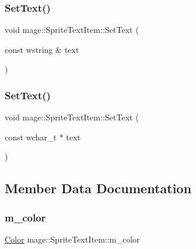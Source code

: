 \hypertarget{structmage_1_1_sprite_text_item_a76da120ec8798b22299d7050e8f05afb}{}\label{structmage_1_1_sprite_text_item_a76da120ec8798b22299d7050e8f05afb} 
\subsubsection{\texorpdfstring{Set\+Text()}{SetText()}\hspace{0.1cm}{\footnotesize\ttfamily [1/2]}}
{\footnotesize\ttfamily void mage\+::\+Sprite\+Text\+Item\+::\+Set\+Text (\begin{DoxyParamCaption}\item[{const wstring \&}]{text }\end{DoxyParamCaption})}

\hypertarget{structmage_1_1_sprite_text_item_a702f0a51a8bf08e0d59b770d81bb2bee}{}\label{structmage_1_1_sprite_text_item_a702f0a51a8bf08e0d59b770d81bb2bee} 
\subsubsection{\texorpdfstring{Set\+Text()}{SetText()}\hspace{0.1cm}{\footnotesize\ttfamily [2/2]}}
{\footnotesize\ttfamily void mage\+::\+Sprite\+Text\+Item\+::\+Set\+Text (\begin{DoxyParamCaption}\item[{const wchar\+\_\+t $\ast$}]{text }\end{DoxyParamCaption})}



\subsection{Member Data Documentation}
\hypertarget{structmage_1_1_sprite_text_item_a47e7057c6de9f22492b09be6c6f3a932}{}\label{structmage_1_1_sprite_text_item_a47e7057c6de9f22492b09be6c6f3a932} 
\subsubsection{\texorpdfstring{m\+\_\+color}{m\_color}}
{\footnotesize\ttfamily \hyperlink{structmage_1_1_color}{Color} mage\+::\+Sprite\+Text\+Item\+::m\+\_\+color\hspace{0.3cm}{\ttfamily [private]}}


